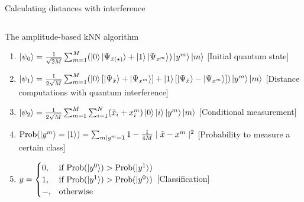 \documentclass[10pt]{beamer}
\begin{document}
{\begin{frame}[fragile]{Calculating distances with interference}
\begin{minipage}[c]{0.69\textwidth}
\begin{tabular}{c | c | c c}
\end{tabular}
\end{minipage}
\end{frame}
}

{
\begin{frame}[fragile]{The amplitude-based kNN algorithm}

\begin{enumerate}
\item $\ket{\psi_0} = \frac{1}{\sqrt{2M}}\sum_{m=1}^{M} (\ket{0}\ket{\Psi_{\tilde{x} (\star)}}+\ket{1}\ket{\Psi_{x^{m}}})\ket{y^{m}}\ket{m}$\hspace{2cm} [Initial quantum state]
\vspace{0.3cm}
\item $\ket{\psi_1} =  \frac{1}{2\sqrt{M}}\sum_{m=1}^{M} (\ket{0}[\ket{\Psi_{\tilde{x}}}+\ket{\Psi_{x^{m}}}]+\ket{1}[\ket{\Psi_{\tilde{x}}}-\ket{\Psi_{x^{m}}}])\ket{y^{m}}\ket{m}$ \hfill
[Distance computations with quantum interference]
\vspace{0.3cm}
\item $\ket{\psi_2} = \frac{1}{2\sqrt{M}}\sum_{m=1}^{M} \sum_{i=1}^{N} (\tilde{x}_i+x_i^m)\ket{0}\ket{i}\ket{y^{m}}\ket{m}$\hfill
\hspace{2cm}[Conditional measurement]
\vspace{0.3cm}
\item $\mathrm{Prob}(\ket{y^m} = \ket{1})= \sum_{m \mid y^m=1} 1 - \frac{1}{4M} \mid \tilde{x} - x^m \mid ^2$\hfill
\hspace{2cm} [Probability to measure a certain class]
\item $ y = \begin{cases}
      0, & \text{if}\ \mathrm{Prob}(\ket{y^0}) > \mathrm{Prob}(\ket{y^1}) \\
      1, & \text{if}\ \mathrm{Prob}(\ket{y^1}) > \mathrm{Prob}(\ket{y^0}) \\
      -, & \text{otherwise}
    \end{cases}$\hspace{1cm} [Classification]
\end{enumerate}
\end{frame}
}
\end{document}
